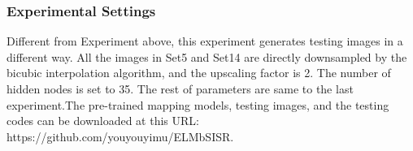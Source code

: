 \documentclass[review,numbers,sort&compress]{elsarticle}  %
\begin{document}
\subsubsection{Experimental Settings}
Different from Experiment above, this experiment generates testing images in a different way. All the images in Set5\cite{dong2014learning} and Set14\cite{zeyde2010single} are directly downsampled by the bicubic interpolation algorithm, and the upscaling factor is 2. The number of hidden nodes is set to 35. The rest of parameters are same to the last experiment.The pre-trained mapping models, testing images, and the testing codes can be downloaded at this URL: https://github.com/youyouyimu/ELMbSISR.

\begin{figure}[t]                   %
    \centering
\end{figure}
\end{document}
